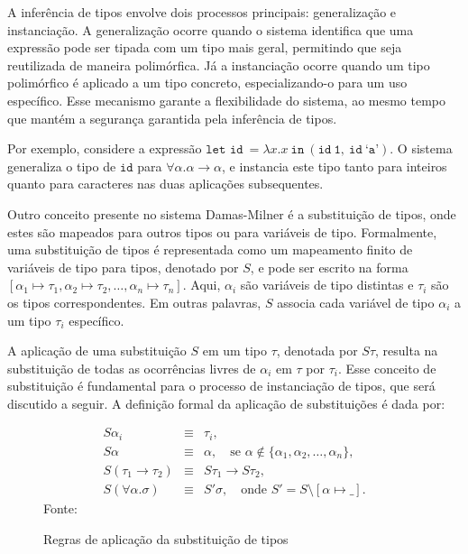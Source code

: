 A inferência de tipos envolve dois processos principais: generalização e instanciação.
A generalização ocorre quando o sistema identifica que uma expressão pode ser tipada com um tipo mais geral, permitindo que seja reutilizada de maneira polimórfica.
Já a instanciação ocorre quando um tipo polimórfico é aplicado a um tipo concreto, especializando-o para um uso específico.
Esse mecanismo garante a flexibilidade do sistema, ao mesmo tempo que mantém a segurança garantida pela inferência de tipos.

Por exemplo, considere a expressão $\texttt{let id} \ = \lambda x.x \ \texttt{in} \ (\texttt{id} \ \texttt{1}, \ \texttt{id} \ \texttt{`a'})$.
O sistema generaliza o tipo de $\texttt{id}$ para $\forall \alpha. \alpha \rightarrow \alpha$, e instancia este tipo tanto para inteiros quanto para caracteres nas duas aplicações subsequentes.

Outro conceito presente no sistema Damas-Milner é a substituição de tipos, onde estes são mapeados para outros tipos ou para variáveis de tipo.
Formalmente, uma substituição de tipos é representada como um mapeamento finito de variáveis de tipo para tipos, denotado por $S$, e pode ser escrito na forma $[ \alpha_1 \mapsto \tau_1, \alpha_2 \mapsto \tau_2, \ldots, \alpha_n \mapsto \tau_n ]$.
Aqui, $\alpha_i$ são variáveis de tipo distintas e $\tau_i$ são os tipos correspondentes.
Em outras palavras, $S$ associa cada variável de tipo $\alpha_i$ a um tipo $\tau_i$ específico.

A aplicação de uma substituição $S$ em um tipo $\tau$, denotada por $S\tau$, resulta na substituição de todas as ocorrências livres de $\alpha_i$ em $\tau$ por $\tau_i$.
Esse conceito de substituição é fundamental para o processo de instanciação de tipos, que será discutido a seguir.
A definição formal da aplicação de substituições é dada por:

\begin{figure}[ht!]
  \caption{Regras de aplicação da substituição de tipos}
  \centering
  \[
    \begin{array}{rcl}
      S\alpha_i                    & \equiv & \tau_i,                                                                          \\[8pt]
      S\alpha                      & \equiv & \alpha, \quad \text{se } \alpha \notin \{\alpha_1, \alpha_2, \ldots, \alpha_n\}, \\[8pt]
      S(\tau_1 \rightarrow \tau_2) & \equiv & S\tau_1 \rightarrow S\tau_2,                                                     \\[8pt]
      S(\forall \alpha.\sigma)     & \equiv & S' \sigma, \quad \text{onde } S' = S \setminus [\alpha \mapsto \_].
    \end{array}
  \]\label{fig:substituicao-tipos}
  \small{Fonte:~\cite{CASTRO2019}}
\end{figure}

